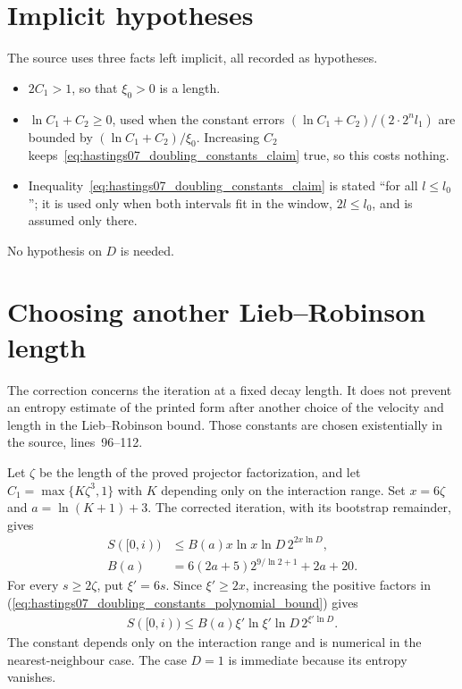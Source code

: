 \documentclass{article}
\begin{document}
\section{Implicit hypotheses}

The source uses three facts left implicit, all recorded as hypotheses.
\begin{itemize}
    \item $2C_1>1$, so that $\xi_0>0$ is a length.
    \item $\ln C_1+C_2\ge0$, used when the constant errors
          $(\ln C_1+C_2)/(2\cdot2^nl_1)$ are bounded by
          $(\ln C_1+C_2)/\xi_0$. Increasing $C_2$
          keeps~\eqref{eq:hastings07_doubling_constants_claim} true, so this
          costs nothing.
    \item Inequality~\eqref{eq:hastings07_doubling_constants_claim} is stated
          ``for all $l\le l_0$''; it is used only when both intervals fit in
          the window, $2l\le l_0$, and is assumed only there.
\end{itemize}
No hypothesis on $D$ is needed.

\section{Choosing another Lieb--Robinson length}

The correction concerns the iteration at a fixed decay length. It does not
prevent an entropy estimate of the printed form after another choice of
the velocity and length in the Lieb--Robinson bound. Those constants are
chosen existentially in the source, lines~96--112.

Let $\zeta$ be the length of the proved projector factorization, and let
$C_1=\max\{K\zeta^3,1\}$ with $K$ depending only on the interaction range.
Set $x=6\zeta$ and $a=\ln(K+1)+3$. The corrected iteration, with its
bootstrap remainder, gives
\begin{align}
    S([0,i))&\le B(a)x\ln x\ln D\,2^{2x\ln D},
    \label{eq:hastings07_doubling_constants_polynomial_bound}
    \\
    B(a)&=6(2a+5)2^{9/\ln2+1}+2a+20.
    \label{eq:hastings07_doubling_constants_coefficient}
\end{align}
For every $s\ge2\zeta$, put $\xi'=6s$. Since $\xi'\ge2x$, increasing the
positive factors in
(\ref{eq:hastings07_doubling_constants_polynomial_bound}) gives
\begin{align}
    S([0,i))\le B(a)\xi'\ln\xi'\ln D\,2^{\xi'\ln D}.
    \label{eq:hastings07_doubling_constants_enlarged_bound}
\end{align}
The constant depends only on the interaction range and is numerical in the
nearest-neighbour case. The case $D=1$ is immediate because its entropy
vanishes.
\end{document}
